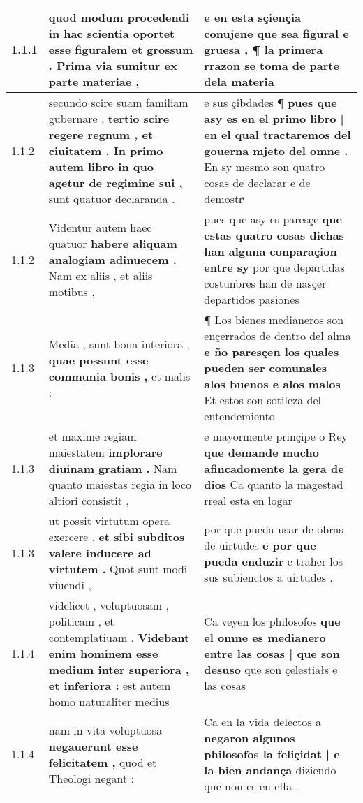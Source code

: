 \begin{tabular}{|p{1cm}|p{6.5cm}|p{6.5cm}|}

\hline
1.1.1 & quod modum procedendi in hac scientia oportet \textbf{ esse figuralem et grossum . } Prima via sumitur ex parte materiae , & e en esta sçiençia conujene \textbf{ que sea figural e gruesa , } ¶ la primera rrazon se toma de parte dela materia \\\hline
1.1.2 & secundo scire suam familiam gubernare , \textbf{ tertio scire regere regnum , et ciuitatem . In primo autem libro in quo agetur de regimine sui , } sunt quatuor declaranda . & e sus çibdades ¶ \textbf{ pues que asy es en el primo libro | en el qual tractaremos del gouerna mjeto del omne . } En sy mesmo son quatro cosas de declarar e de demostrͣ \\\hline
1.1.2 & Videntur autem haec quatuor \textbf{ habere aliquam analogiam adinuecem . } Nam ex aliis , et aliis motibus , & pues que asy es paresçe \textbf{ que estas quatro cosas dichas han alguna conparaçion entre sy } por que departidas costunbres han de nasçer departidos pasiones \\\hline
1.1.3 & Media , sunt bona interiora , \textbf{ quae possunt esse communia bonis , } et malis : & ¶ Los bienes medianeros son ençerrados de dentro del alma \textbf{ e ño paresçen los quales pueden ser comunales alos buenos e alos malos } Et estos son sotileza del entendemiento \\\hline
1.1.3 & et maxime regiam maiestatem \textbf{ implorare diuinam gratiam . } Nam quanto maiestas regia in loco altiori consistit , & e mayormente prinçipe o Rey \textbf{ que demande mucho afincadomente la gera de dios } Ca quanto la magestad rreal esta en logar \\\hline
1.1.3 & ut possit virtutum opera exercere , \textbf{ et sibi subditos valere inducere ad virtutem . } Quot sunt modi viuendi , & por que pueda usar de obras de uirtudes \textbf{ e por que pueda enduzir } e traher los sus subienctos a uirtudes . \\\hline
1.1.4 & videlicet , voluptuosam , politicam , et contemplatiuam . \textbf{ Videbant enim hominem esse medium inter superiora , et inferiora : } est autem homo naturaliter medius & Ca veyen los philosofos \textbf{ que el omne es medianero entre las cosas | que son desuso } que son çelestiałs e las cosas \\\hline
1.1.4 & nam in vita voluptuosa \textbf{ negauerunt esse felicitatem , } quod et Theologi negant : & Ca en la vida delectos a \textbf{ negaron algunos philosofos la feliçidat | e la bien andança } diziendo que non es en elła . \\\hline

\end{tabular}

